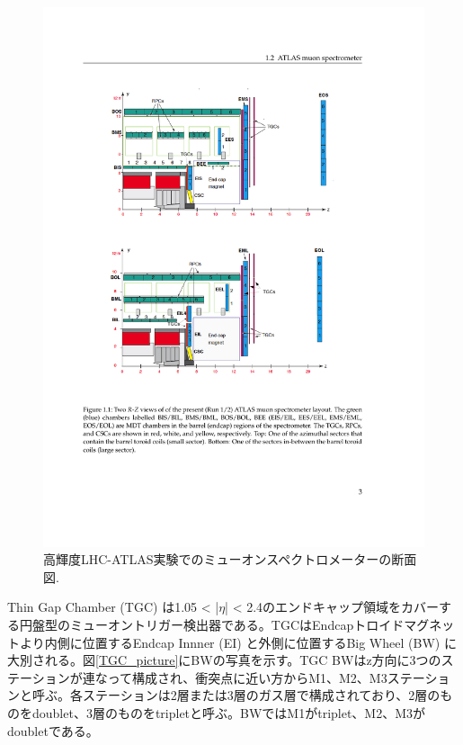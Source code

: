 \begin{figure} 
\centering
\includegraphics[width=16cm]{fig/Intro/Muonspectrometer.pdf}
\caption[高輝度LHC-ATLAS実験でのミューオンスペクトロメーターの断面図]{高輝度LHC-ATLAS実験でのミューオンスペクトロメーターの断面図.\cite{tdr_phase2muon_2017017}
}
\label{Muonspectrometer2}
\end{figure}


Thin Gap Chamber (TGC) は1.05 < |$\eta$| < 2.4のエンドキャップ領域をカバーする円盤型のミューオントリガー検出器である。TGCはEndcapトロイドマグネットより内側に位置するEndcap Innner (EI) と外側に位置するBig Wheel (BW) に大別される。図\ref{TGC_picture}にBWの写真を示す。TGC BWはz方向に3つのステーションが連なって構成され、衝突点に近い方からM1、M2、M3ステーションと呼ぶ。各ステーションは2層または3層のガス層で構成されており、2層のものをdoublet、3層のものをtripletと呼ぶ。BWではM1がtriplet、M2、M3がdoubletである。

